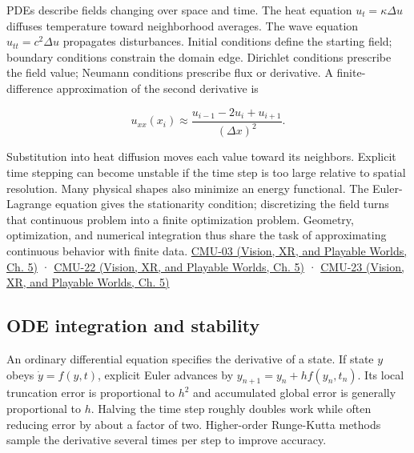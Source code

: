 PDEs describe fields changing over space and time. The heat equation \(u_t=\kappa\Delta u\) diffuses temperature toward neighborhood averages. The wave equation \(u_{tt}=c^2\Delta u\) propagates disturbances. Initial conditions define the starting field; boundary conditions constrain the domain edge. Dirichlet conditions prescribe the field value; Neumann conditions prescribe flux or derivative. A finite-difference approximation of the second derivative is

\[
u_{xx}(x_i)\approx\frac{u_{i-1}-2u_i+u_{i+1}}{(\Delta x)^2}.
\]

Substitution into heat diffusion moves each value toward its neighbors. Explicit time stepping can become unstable if the time step is too large relative to spatial resolution. Many physical shapes also minimize an energy functional. The Euler-Lagrange equation gives the stationarity condition; discretizing the field turns that continuous problem into a finite optimization problem. Geometry, optimization, and numerical integration thus share the task of approximating continuous behavior with finite data. \href{../07-Vision-XR-and-Playable-Worlds/main.pdf\#nameddest=04-visual-computing-ii-ch036-cmu-03---vector-calculus-preview}{CMU-03 (Vision, XR, and Playable Worlds, Ch. 5)} · \href{../07-Vision-XR-and-Playable-Worlds/main.pdf\#nameddest=04-visual-computing-ii-ch036-cmu-22---optimization}{CMU-22 (Vision, XR, and Playable Worlds, Ch. 5)} · \href{../07-Vision-XR-and-Playable-Worlds/main.pdf\#nameddest=04-visual-computing-ii-ch036-cmu-23---physically-based-animation-and-pdes}{CMU-23 (Vision, XR, and Playable Worlds, Ch. 5)}

\subsection{ODE integration and stability}\label{04-visual-computing-ii-ch029-ode-integration-and-stability}

An ordinary differential equation specifies the derivative of a state. If state \(y\) obeys \(\dot y=f(y,t)\), explicit Euler advances by \(y_{n+1}=y_n+h f(y_n,t_n)\). Its local truncation error is proportional to \(h^2\) and accumulated global error is generally proportional to \(h\). Halving the time step roughly doubles work while often reducing error by about a factor of two. Higher-order Runge-Kutta methods sample the derivative several times per step to improve accuracy.

